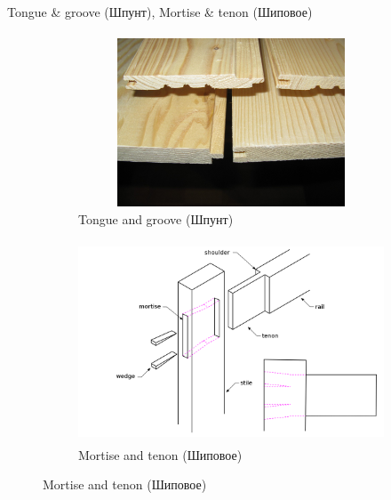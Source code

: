 \documentclass[aspectratio=169]{beamer}
\begin{document}
\begin{frame}[t]{Tongue \& groove (Шпунт), Mortise \& tenon (Шиповое)}
    \framesubtitle{}
    \begin{figure}[H]
        \begin{subfigure}{0.49\textwidth}
            \centering\includegraphics[height=5cm,width=1\textwidth,keepaspectratio]{spund.jpg}
            \caption*{Tongue and groove (Шпунт)}
            \label{fig:spund.jpg}
        \end{subfigure}
        \begin{subfigure}{0.49\textwidth}
            \centering\includegraphics[height=6cm,width=1\textwidth,keepaspectratio]{Mortise.png}
            \caption*{Mortise and tenon (Шиповое)}
            \label{fig:Mortise.png}
        \end{subfigure}
    \end{figure}
\end{frame}
\end{document}
